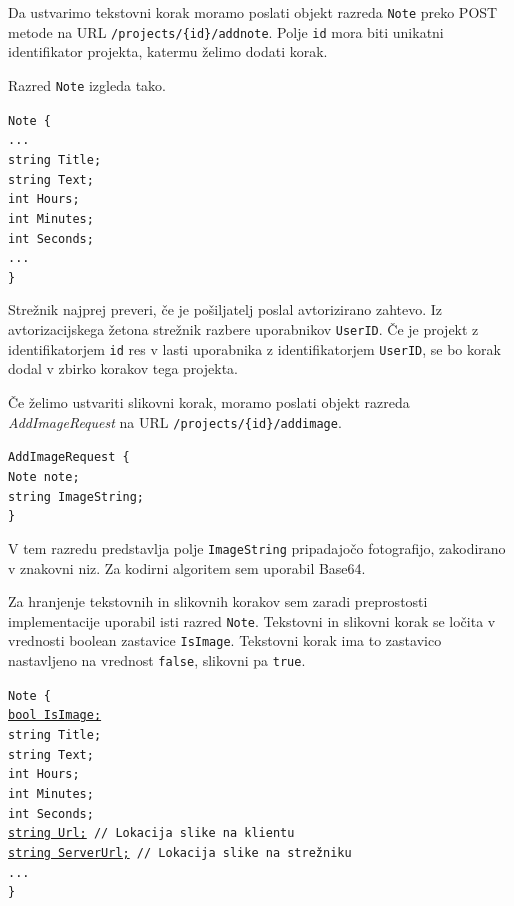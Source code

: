 \documentclass[a4paper, 12pt]{book}
\begin{document}
Da ustvarimo tekstovni korak moramo poslati objekt razreda \texttt{Note} preko POST metode na URL \texttt{/projects/\{id\}/addnote}.
Polje \texttt{id} mora biti unikatni identifikator projekta, katermu želimo dodati korak.

\noindent Razred \texttt{Note} izgleda tako.

\noindent \texttt{Note \{ \\
...\\ 
string Title; \\
string Text; \\
int Hours; \\
int Minutes; \\
int Seconds; \\
...\\ 
\} }

Strežnik najprej preveri, če je pošiljatelj poslal avtorizirano zahtevo.
Iz avtorizacijskega žetona strežnik razbere uporabnikov \texttt{UserID}. 
Če je projekt z identifikatorjem \texttt{id} res v lasti uporabnika z identifikatorjem \texttt{UserID}, se bo korak dodal v zbirko korakov tega projekta.

Če želimo ustvariti slikovni korak, moramo poslati objekt razreda \textit{AddImageRequest} na URL \texttt{/projects/\{id\}/addimage}.

\noindent \texttt{AddImageRequest \{ \\
Note note; \\
string ImageString;  \\
\} }

V tem razredu predstavlja polje \texttt{ImageString} pripadajočo fotografijo, zakodirano v znakovni niz.
Za kodirni algoritem sem uporabil Base64.

Za hranjenje tekstovnih in slikovnih korakov sem zaradi preprostosti implementacije uporabil isti razred \texttt{Note}.
Tekstovni in slikovni korak se ločita v vrednosti boolean zastavice \texttt{IsImage}.
Tekstovni korak ima to zastavico nastavljeno na vrednost \texttt{false}, slikovni pa \texttt{true}.

\noindent \texttt{Note \{ \\
\underline{bool IsImage;}  \\
string Title; \\
string Text; \\
int Hours; \\
int Minutes; \\
int Seconds; \\
\underline{string Url;} // Lokacija slike na klientu \\
\underline{string ServerUrl;} // Lokacija slike na strežniku \\
... \\
\}
}
\end{document}

